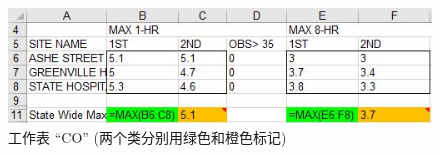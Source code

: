 \begin{figure}[tbp]
    \centering
    \includegraphics[width = .95\columnwidth]{figure/figure9.jpg}
    \caption{工作表 ``CO'' (两个类分别用绿色和橙色标记)}
    \label{figure9}
\end{figure}
